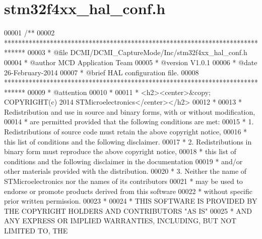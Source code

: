 \section{stm32f4xx\+\_\+hal\+\_\+conf.\+h}
\label{stm32f4xx__hal__conf_8h_source}

\begin{DoxyCode}
00001 \textcolor{comment}{/**}
00002 \textcolor{comment}{  ******************************************************************************}
00003 \textcolor{comment}{  * @file    DCMI/DCMI\_CaptureMode/Inc/stm32f4xx\_hal\_conf.h}
00004 \textcolor{comment}{  * @author  MCD Application Team}
00005 \textcolor{comment}{  * @version V1.0.1}
00006 \textcolor{comment}{  * @date    26-February-2014}
00007 \textcolor{comment}{  * @brief   HAL configuration file.}
00008 \textcolor{comment}{  ******************************************************************************}
00009 \textcolor{comment}{  * @attention}
00010 \textcolor{comment}{  *}
00011 \textcolor{comment}{  * <h2><center>&copy; COPYRIGHT(c) 2014 STMicroelectronics</center></h2>}
00012 \textcolor{comment}{  *}
00013 \textcolor{comment}{  * Redistribution and use in source and binary forms, with or without modification,}
00014 \textcolor{comment}{  * are permitted provided that the following conditions are met:}
00015 \textcolor{comment}{  *   1. Redistributions of source code must retain the above copyright notice,}
00016 \textcolor{comment}{  *      this list of conditions and the following disclaimer.}
00017 \textcolor{comment}{  *   2. Redistributions in binary form must reproduce the above copyright notice,}
00018 \textcolor{comment}{  *      this list of conditions and the following disclaimer in the documentation}
00019 \textcolor{comment}{  *      and/or other materials provided with the distribution.}
00020 \textcolor{comment}{  *   3. Neither the name of STMicroelectronics nor the names of its contributors}
00021 \textcolor{comment}{  *      may be used to endorse or promote products derived from this software}
00022 \textcolor{comment}{  *      without specific prior written permission.}
00023 \textcolor{comment}{  *}
00024 \textcolor{comment}{  * THIS SOFTWARE IS PROVIDED BY THE COPYRIGHT HOLDERS AND CONTRIBUTORS "AS IS"}
00025 \textcolor{comment}{  * AND ANY EXPRESS OR IMPLIED WARRANTIES, INCLUDING, BUT NOT LIMITED TO, THE}

\end{DoxyCode}
